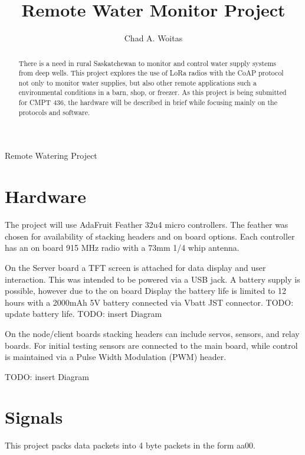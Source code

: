 \documentclass[]{report}
\title{Remote Water Monitor Project}
\author{Chad A. Woitas}
\begin{document}
\maketitle
 Remote Watering Project
\begin{abstract}
	There is a need in rural Saskatchewan to monitor and control water supply systems from deep wells. This project explores the use of LoRa radios with the CoAP protocol not only to monitor water supplies, but also other remote applications such a environmental conditions in a barn, shop, or freezer. As this project is being submitted for CMPT 436, the hardware will be described in brief while focusing mainly on the protocols and software.
\end{abstract}

\section{Hardware}
	The project will use AdaFruit Feather 32u4 micro controllers. The feather was chosen for availability of stacking headers and on board options. Each controller has an on board 915 MHz radio with a 73mm 1/4 whip antenna. 
	
	On the Server board a TFT screen is attached for data display and user interaction. This was intended to be powered via a USB jack. A battery supply is possible, however due to the on board Display the battery life is limited to 12 hours with a 2000mAh 5V battery connected via Vbatt JST connector.
	TODO: update battery life.
	TODO: insert Diagram 
	
	On the node/client boards stacking headers can include servos, sensors, and relay boards. For initial testing sensors are connected to the main board, while control is maintained via a Pulse Width Modulation (PWM) header. 
	
	TODO: insert Diagram
	
\section{Signals}  
	
	This project packs data packets into 4 byte packets in the form aa00. 
	
\end{document}

